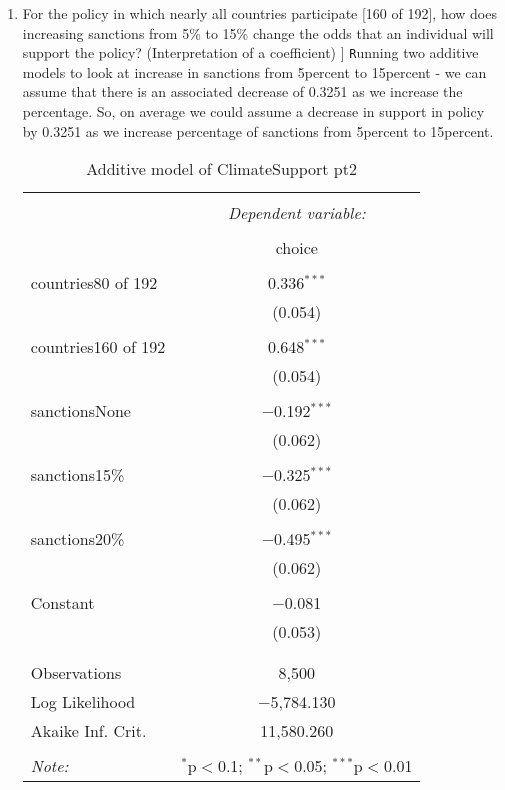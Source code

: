 \documentclass[12pt,letterpaper]{article}
\begin{document}
\begin{enumerate}
	\begin{enumerate}
		\item
		For the policy in which nearly all countries participate [160 of 192], how does increasing sanctions from 5\% to 15\% change the odds that an individual will support the policy? (Interpretation of a coefficient)
			]
				\texttt Running two additive models to look at increase in sanctions from 5percent to 15percent - we can assume that there is  an associated decrease of 0.3251 as we increase the percentage. So, on average we could assume a decrease in support in policy by 0.3251 as we increase percentage of sanctions from 5percent to 15percent.
			\begin{table}[!htbp] \centering   \caption{Additive model of ClimateSupport pt2}   \label{} \begin{tabular}{@{\extracolsep{5pt}}lc} \\[-1.8ex]\hline \hline \\[-1.8ex]  & \multicolumn{1}{c}{\textit{Dependent variable:}} \\ \cline{2-2} \\[-1.8ex] & choice \\ \hline \\[-1.8ex]  countries80 of 192 & 0.336$^{***}$ \\   & (0.054) \\   & \\  countries160 of 192 & 0.648$^{***}$ \\   & (0.054) \\   & \\  sanctionsNone & $-$0.192$^{***}$ \\   & (0.062) \\   & \\  sanctions15\% & $-$0.325$^{***}$ \\   & (0.062) \\   & \\  sanctions20\% & $-$0.495$^{***}$ \\   & (0.062) \\   & \\  Constant & $-$0.081 \\   & (0.053) \\   & \\ \hline \\[-1.8ex] Observations & 8,500 \\ Log Likelihood & $-$5,784.130 \\ Akaike Inf. Crit. & 11,580.260 \\ \hline \hline \\[-1.8ex] \textit{Note:}  & \multicolumn{1}{r}{$^{*}$p$<$0.1; $^{**}$p$<$0.05; $^{***}$p$<$0.01} \\ \end{tabular} \end{table}

\end{enumerate}
\end{enumerate}
\end{document}
